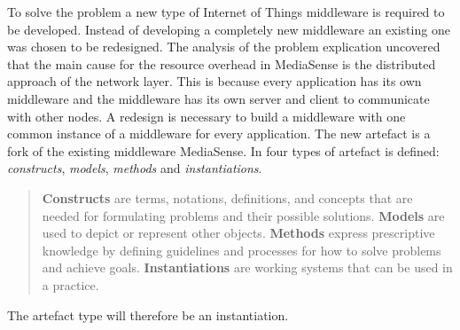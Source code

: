 To solve the problem a new type of Internet of Things middleware is required to be developed. Instead of developing a completely new middleware an existing one was chosen to be redesigned. The analysis of the problem explication uncovered that the main cause for the resource overhead in MediaSense is the distributed approach of the network layer. This is because every application has its own middleware and the middleware has its own server and client to communicate with other nodes. A redesign is necessary to build a middleware with one common instance of a middleware for every application. The new artefact is a fork of the existing middleware MediaSense. In \cite{johannesson2012design} four types of artefact is defined: \emph{constructs}, \emph{models}, \emph{methods} and \emph{instantiations}.  

\begin{quotation}
  \textbf{Constructs} are terms, notations, definitions, and concepts that are needed for formulating problems and their possible solutions.
  \textbf{Models} are used to depict or represent other objects.
  \textbf{Methods} express prescriptive knowledge by defining guidelines and processes for how to solve problems and achieve goals.
  \textbf{Instantiations} are working systems that can be used in a practice.
\end{quotation}
The artefact type will therefore be an instantiation.
